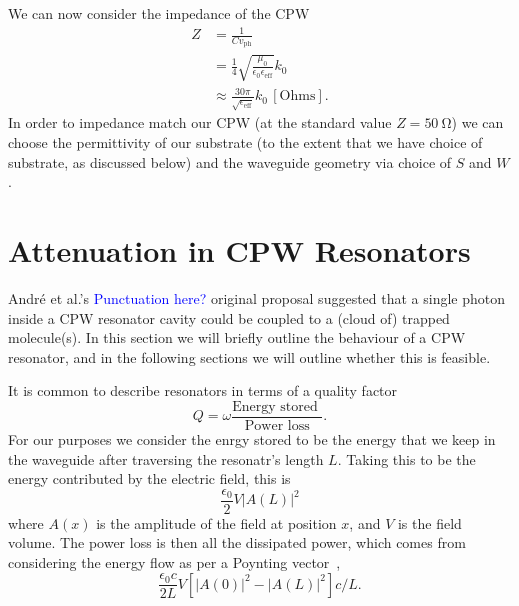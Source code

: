 \documentclass[a4paper]{article}
\newcommand{\cm}[1]{\textcolor{blue}{#1}} %
\begin{document}
We can now consider the impedance of the CPW~\cite{Simons2004}
\begin{align}
  Z &= \frac{1}{C v_\mathrm{ph}} \\
    &= \frac{1}{4}\sqrt{\frac{\mu_0}{\epsilon_0 \epsilon_\mathrm{eff}}}k_0 \\
    &\approx \frac{30\pi}{\sqrt{\epsilon_\mathrm{eff}}}k_0 \, \mathrm{[Ohms]}.
\end{align}
In order to impedance match our CPW (at the standard value $Z=\SI{50}{\ohm}$) we
can choose the permittivity of our substrate (to the extent that we have choice
of substrate, as discussed below) and the waveguide geometry via choice of $S$
and $W$.


\section{Attenuation in CPW Resonators}

Andr\'e et al.'s \cm{Punctuation here?} original proposal suggested that a
single photon inside a CPW resonator cavity could be coupled to a (cloud of)
trapped molecule(s). In this section we will briefly outline the behaviour of a
CPW resonator, and in the following sections we will outline whether this is
feasible. %

It is common to describe resonators in terms of a quality
factor~\cite{Jackson1975, 1125652}
\begin{equation}
  Q = \omega \frac{\text{Energy stored }}{\text{Power loss}}.
\end{equation}
For our purposes we consider the enrgy stored to be the energy that we keep in
the waveguide after traversing the resonatr's length $L$. Taking this to be the
energy contributed by the electric field, this is
\begin{equation}
  \frac{\epsilon_0}{2} V \lvert A(L) \rvert^2
\end{equation}
where $A(x)$ is the amplitude of the field at position $x$, and $V$ is the field
volume.  The power loss is then all the dissipated power, which comes from
considering the energy flow as per a Poynting vector~\cite{Jackson1975},
\begin{equation}
  \frac{\epsilon_0 c}{2L}V \left[ \lvert A(0) \rvert^2 - \lvert A(L) \rvert^2
  \right] c/L.
\end{equation}
\end{document}
